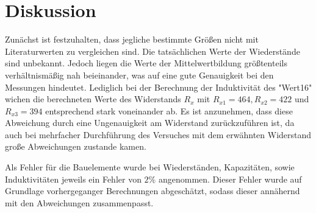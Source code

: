 \section{Diskussion}
\label{sec:Diskussion}

Zunächst ist festzuhalten, dass jegliche bestimmte Größen nicht mit Literaturwerten 
zu vergleichen sind. Die tatsächlichen Werte der Wiederstände sind unbekannt.
Jedoch liegen die Werte der Mittelwertbildung größtenteils verhältnismäßig nah
beieinander, was auf eine gute Genauigkeit bei den Messungen hindeutet. 
Lediglich bei der Berechnung der Induktivität des "Wert16" wichen die berechneten
Werte des Widerstands $R_x$ mit $R_{x1} = 464, R_{x2} = 422$ und $R_{x3} = 394$ 
entsprechend stark voneinander ab.
Es ist anzunehmen, dass diese Abweichung durch eine Ungenauigkeit am Widerstand 
zurückzuführen ist, da auch bei mehrfacher Durchführung des Versuches mit dem 
erwähnten Widerstand große Abweichungen zustande kamen.
\par\vspace{0.5em}
\noindent Als Fehler für die Bauelemente wurde bei Wiederständen, Kapazitäten,
sowie Induktivitäten jeweils ein Fehler von $2 \%$ angenommen. Dieser Fehler
wurde auf Grundlage vorhergeganger Berechnungen abgeschätzt, sodass dieser
annähernd mit den Abweichungen zusammenpasst.

